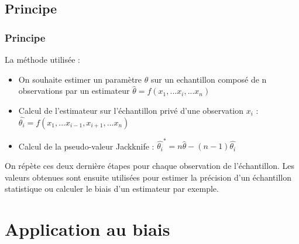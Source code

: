 \documentclass[handout]{beamer}
\begin{document}
		\subsection{Principe}
		\begin{frame}
			\frametitle{Principe}
% 
% 

			La méthode utilisée :
			\begin{itemize}
				\item On souhaite estimer un paramètre $\theta$ sur un echantillon composé de n observations par un estimateur $\hat{\theta} = f(x_1,...x_i,...x_n)$
				\item Calcul de l'estimateur sur l'échantillon privé d'une observation $x_i$ : $\hat{\theta_i} = f(x_1,...x_{i-1},x_{i+1},...x_n)$
				\item Calcul de la pseudo-valeur Jackknife : $\hat{\theta_i}^* = n\hat{\theta} - (n-1) \hat{\theta_i}$
			\end{itemize}
			
			\vspace{15px}
			
			On répète ces deux dernière étapes pour chaque observation de l'échantillon. Les valeurs obtenues sont ensuite utilisées pour estimer la précision d'un échantillon statistique ou calculer le biais d'un estimateur par exemple.

% 
		\end{frame}

	\section{Application au biais}

\end{document}
